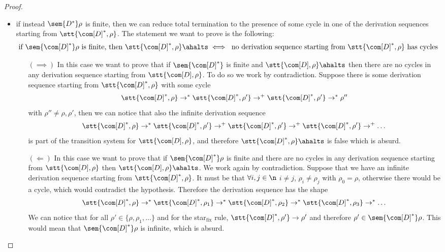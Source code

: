 \begin{proof}
\begin{itemize}
  \item if instead \(\sem{D^*}\rho\) is finite, then we can
    reduce total termination to the presence of some cycle in one of
    the derivation sequences starting from
    \(\stt{\com[D]^*, \rho}\). The statement we want to prove is the
    following:
    \begin{equation*}
      \text{if }\sem{\com[D]^*}\rho \text{ is finite, then } \stt{\com[D]^*, \rho} \ahalts \iff \text{ no derivation sequence starting from } \stt{\com[D]^*, \rho} \text{ has cycles}
    \end{equation*}
    \begin{itemize}
    \item[\((\implies)\)] In this case we want to prove that if
      \(\sem{\com[D]^*}\) is finite and
      \(\stt{\com[D], \rho} \ahalts\) then there are no cycles in
      any derivation sequence starting from \(\stt{\com[D],
        \rho}\). To do so we work by contradiction. Suppose there is
      some derivation sequence starting from
      \(\stt{\com[D]^*, \rho}\) with some cycle
      \begin{equation*}
        \stt{\com[D]^*, \rho} \to^* \stt{\com[D]^*, \rho'} \to^+ \stt{\com[D]^*, \rho'} \to^* \rho''
      \end{equation*}
      with \(\rho''\neq \rho, \rho'\), then we can notice that also
      the infinite derivation sequence
      \begin{equation*}
        \stt{\com[D]^*, \rho} \to^* \stt{\com[D]^*, \rho'} \to^+ \stt{\com[D]^*, \rho'} \to^+ \stt{\com[D]^*, \rho'} \to^+ \dots
      \end{equation*}
      is part of the transition system for \(\stt{\com[D], \rho}\),
      and therefore \(\stt{\com[D]^*, \rho} \ahalts\) is false which
      is absurd.
    \item[\((\Leftarrow)\)] In this case we want to prove that if
      \(\sem{\com[D]^*}\rho\) is finite and there are no cycles in any
      derivation sequence starting from \(\stt{\com[D], \rho}\) then
      \(\stt{\com[D], \rho} \ahalts\). We work again by
      contradiction. Suppose that we have an infinite derivation
      sequence starting from \(\stt{\com[D]^*, \rho}\). It must be
      that \(\forall i,j \in \n\) \(i \neq j\), \(\rho_i \neq \rho_j\)
      with \(\rho_0 = \rho\), otherwise there would be a cycle, which
      would contradict the hypothesis. Therefore the derivation
      sequence has the shape
      \begin{equation*}
        \stt{\com[D]^*, \rho} \to^* \stt{\com[D]^*, \rho_1} \to^* \stt{\com[D]^*, \rho_2} \to^* \stt{\com[D]^*, \rho_3} \to^* \dots
      \end{equation*}
      We can notice that for all \(\rho' \in \{\rho, \rho_1, \dots\}\)
      and for the star\(_{\text{fix}}\) rule,
      \(\stt{\com[D]^*, \rho'} \to \rho'\) and therefore
      \(\rho'\in \sem{\com[D]^*}\rho\). This would mean that
      \(\sem{\com[D]^*}\rho\) is infinite, which is absurd.
    \end{itemize}


\end{itemize}
\end{proof}
